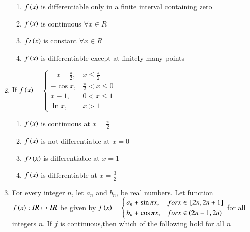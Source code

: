 \documentclass[journal]{IEEEtran}
\numberwithin{equation}{enumi}
\numberwithin{figure}{enumi}
\begin{document}
\begin{enumerate}
    \hfill{}
    
    \begin{enumerate}

        \item $f\left(x\right)$ is differentiable only in a finite interval containing zero 
        \item $f\left(x\right)$ is continuous $\forall x\in R$
	\item $f{\prime}\left(x\right)$ is constant $\forall x\in R$
        \item $f\left(x\right)$ is differentiable except at finitely many points 
    \end{enumerate}


    \item 
    If $f\left(x\right)$= 
    $\begin{cases}
        -x-\frac{\pi}{2}, & x\leq \frac{\pi}{2} \\
        -\cos x, & \frac{\pi}{2}<x\leq 0 \\
        x-1, & 0<x\leq1 \\
        \ln x, & x>1
    \end{cases}$ 

    \hfill{}
    
    \begin{enumerate}

        \item $f\left(x\right)$ is continuous at $x=\frac{\pi}{2}$
        \item $f\left(x\right)$ is not differentiable at $x=0$
	\item $f{\prime}\left(x\right)$ is differentiable at $x=1$
        \item $f\left(x\right)$ is differentiable at $x=\frac{3}{2}$
    \end{enumerate}


    \item 
    For every integer $n$, let $a_n$ and $b_n$, be real numbers. Let function $f\left(x\right): IR \mapsto IR$ be given by
    $f\left(x\right)$= 
    $\begin{cases}
       a_n+\sin\pi x, & for x\in {}\left[2n,2n+1\right] \\
       b_n+\cos\pi x, & for x\in \left(2n-1,2n\right)
    \end{cases}$
    for all integers $n$. If $f$ is continuous,then which of the following hold for all $n$ 

    \hfill{}
    
    \begin{enumerate}
        

\end{enumerate}
\end{enumerate}
\end{document}
